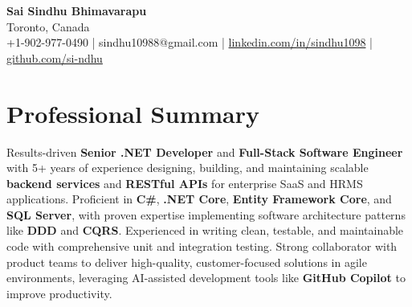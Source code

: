 \documentclass[letterpaper,11pt]{article}
\begin{document}
\begin{center}
  {\Large \textbf{Sai Sindhu Bhimavarapu}} \\
  Toronto, Canada \\
  +1-902-977-0490 \enspace | \enspace sindhu10988@gmail.com \enspace | \enspace \href{https://www.linkedin.com/in/sindhu1098/}{linkedin.com/in/sindhu1098} \enspace | \enspace \href{https://github.com/si-ndhu}{github.com/si-ndhu}
\end{center}

\section{Professional Summary}
  \begin{itemize}[leftmargin=0.15in, label={}]
    \small{\item{
     Results-driven \textbf{Senior .NET Developer} and \textbf{Full-Stack Software Engineer} with 5+ years of experience designing, building, and maintaining scalable \textbf{backend services} and \textbf{RESTful APIs} for enterprise SaaS and HRMS applications. Proficient in \textbf{C\#}, \textbf{.NET Core}, \textbf{Entity Framework Core}, and \textbf{SQL Server}, with proven expertise implementing software architecture patterns like \textbf{DDD} and \textbf{CQRS}. Experienced in writing clean, testable, and maintainable code with comprehensive unit and integration testing. Strong collaborator with product teams to deliver high-quality, customer-focused solutions in agile environments, leveraging AI-assisted development tools like \textbf{GitHub Copilot} to improve productivity.
    }}
  \end{itemize}
\vspace{-16pt}

\end{document}
